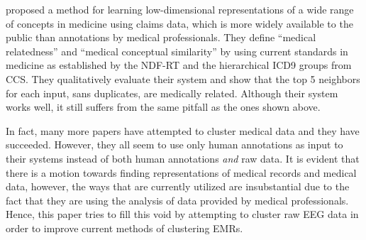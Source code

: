 \citet{choi2016learning} proposed a method for learning low-dimensional representations of a wide range of concepts in medicine using claims data, which is more widely available to the public than annotations by medical professionals. They define  ``medical relatedness'' and  ``medical conceptual similarity'' by using current standards in medicine as established by the NDF-RT and the hierarchical ICD9 groups from CCS. They qualitatively evaluate their system and show that the top 5 neighbors for each input, sans duplicates, are medically related. Although their system works well, it still suffers from the same pitfall as the ones shown above. 

In fact, many more papers have attempted to cluster medical data and they have succeeded. However, they all seem to use only human annotations as input to their systems instead of both human annotations \textit{and} raw data. It is evident that there is a motion towards finding representations of medical records and medical data, however, the ways that are currently utilized are insubstantial due to the fact that they are using the analysis of data provided by medical professionals. Hence, this paper tries to fill this void by attempting to cluster raw EEG data in order to improve current methods of clustering EMRs. 


